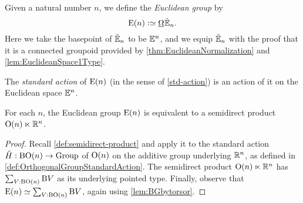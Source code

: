 \begin{definition}\label{def:EuclideanGroup}
  Given a natural number $n$, we define the {\em Euclidean group} by
  $$\EucGp n \defeq \mkgroup \ES_n.$$  Here we take the basepoint of ${\tilde {\mathbb E}}_n$ to be $\mathbb E^n$,
  and we equip ${\tilde {\mathbb E}}_n$ with the proof that it is a connected groupoid provided
  by \cref{thm:EuclideanNormalization} and \cref{lem:EuclideanSpace1Type}.
\end{definition}

The {\em standard action} of $\mathrm{E}(n)$ (in the sense of \cref{std-action}) is
an action of it on the Euclidean space $\mathbb E^n$.

\begin{theorem}\label{thm:EuclideanGroupSemidirect}
  For each $n$, the Euclidean group $\mathrm{E}(n)$ is equivalent to a semidirect
  product $\mathrm{O}(n) \ltimes \mathbb{R}^n$.
\end{theorem}

\begin{proof}
  Recall \cref{def:semidirect-product} and apply it to the standard action
  $\tilde H : \mathrm{B} \mathrm{O}(n) \to \mathrm{Group}$ of $\mathrm{O}(n)$ on the additive group
  underlying $\mathbb{R}^n$, as defined in \cref{def:OrthogonalGroupStandardAction}.
  The semidirect product $\mathrm{O}(n) \ltimes \mathbb{R}^n$ has
  $\sum_{V:\mathrm{B} \mathrm{O}(n)} \mathrm{B} V$ as its underlying pointed type.
  Finally, observe that $\mathrm{E}(n) \simeq \sum_{V:\mathrm{B} \mathrm{O}(n)} \mathrm{B} V$, again
  using \cref{lem:BGbytorsor}.
\end{proof}
